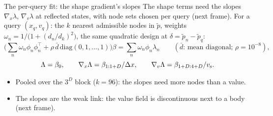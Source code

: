 \begin{frame}{The per-query fit: the shape gradient's slopes}
The shape terms need the slopes $\nabla_x\lambda$, $\nabla_v\lambda$ at reflected states, with node sets chosen
per query (next frame).  For a query $(x_q, v_q)$: the $k$ nearest admissible nodes in $\tilde p$, weights
$\omega_n = 1/\big(1 + (d_n/d_k)^2\big)$, the same quadratic design at $\delta = \tilde p_n - \tilde p_q$:
\[
\Big(\sum_n\omega_n\phi_n\phi_n^\top + \rho\,\bar d\,\mathrm{diag}(0,1,\dots,1)\Big)\beta
= \sum_n\omega_n\phi_n\lambda_n\qquad(\bar d\text{: mean diagonal; } \rho = 10^{-8}),
\]
\[
\Lambda = \beta_0,\qquad \nabla_x\Lambda = \beta_{1:1+D}/\Delta x,\qquad \nabla_v\Lambda = \beta_{1+D:4+D}/v_{\mathrm{s}} .
\]
\begin{itemize}
\item Pooled over the $3^D$ block ($k = 96$): the slopes need more nodes than a value.
\item The slopes are the weak link: the value field is discontinuous next to a body (next frame).
\end{itemize}
\end{frame}

